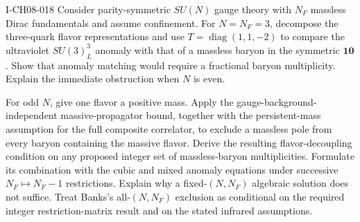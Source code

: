 \begin{exercise}{I-CH08-018}
Consider parity-symmetric $SU(N)$ gauge theory with $N_F$ massless Dirac
fundamentals and assume confinement.  For $N=N_F=3$, decompose the
three-quark flavor representations and use
$T=\operatorname{diag}(1,1,-2)$ to compare the ultraviolet
$SU(3)_L^3$ anomaly with that of a massless baryon in the symmetric
$\mathbf{10}$.  Show that anomaly matching would require a fractional baryon
multiplicity.  Explain the immediate obstruction when $N$ is even.

For odd $N$, give one flavor a positive mass.  Apply the
gauge-background-independent massive-propagator bound, together with the
persistent-mass assumption for the full composite correlator, to exclude a
massless pole from every baryon containing the massive flavor.  Derive the
resulting flavor-decoupling condition on any proposed integer set of
massless-baryon multiplicities.  Formulate its combination with the cubic and
mixed anomaly equations under successive $N_F\mapsto N_F-1$ restrictions.
Explain why a fixed-$(N,N_F)$ algebraic solution does not suffice.  Treat
Banks's all-$(N,N_F)$ exclusion as conditional on the required integer
restriction-matrix result and on the stated infrared assumptions.
\end{exercise}
